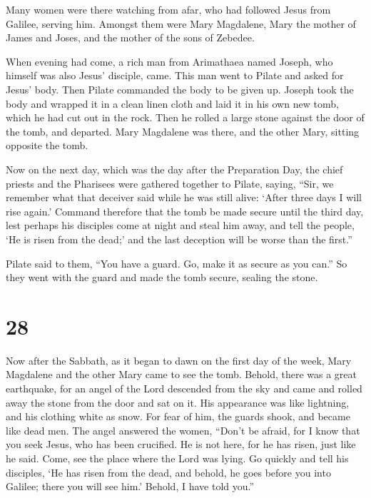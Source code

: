  Many women were there watching from afar, who had
followed Jesus from Galilee, serving him.  Amongst them
were Mary Magdalene, Mary the mother of James and Joses, and the mother
of the sons of Zebedee.

 When evening had come, a rich man from Arimathaea named
Joseph, who himself was also Jesus' disciple, came.  This
man went to Pilate and asked for Jesus' body. Then Pilate commanded the
body to be given up.  Joseph took the body and wrapped it
in a clean linen cloth  and laid it in his own new tomb,
which he had cut out in the rock. Then he rolled a large stone against
the door of the tomb, and departed.  Mary Magdalene was
there, and the other Mary, sitting opposite the tomb.

 Now on the next day, which was the day after the
Preparation Day, the chief priests and the Pharisees were gathered
together to Pilate,  saying, ``Sir, we remember what that
deceiver said while he was still alive: `After three days I will rise
again.'  Command therefore that the tomb be made secure
until the third day, lest perhaps his disciples come at night and steal
him away, and tell the people, `He is risen from the dead;' and the last
deception will be worse than the first.''

 Pilate said to them, ``You have a guard. Go, make it as
secure as you can.''  So they went with the guard and
made the tomb secure, sealing the stone.

\hypertarget{section-27}{%
\section{28}\label{section-27}}

 Now after the Sabbath, as it began to dawn on the first
day of the week, Mary Magdalene and the other Mary came to see the tomb.
 Behold, there was a great earthquake, for an angel of the
Lord descended from the sky and came and rolled away the stone from the
door and sat on it.  His appearance was like lightning,
and his clothing white as snow.  For fear of him, the
guards shook, and became like dead men.  The angel
answered the women, ``Don't be afraid, for I know that you seek Jesus,
who has been crucified.  He is not here, for he has risen,
just like he said. Come, see the place where the Lord was lying.
 Go quickly and tell his disciples, `He has risen from the
dead, and behold, he goes before you into Galilee; there you will see
him.' Behold, I have told you.''

